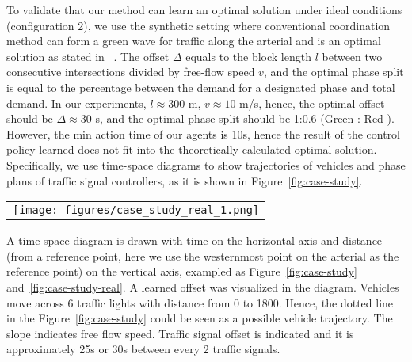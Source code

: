 To validate that our method can learn an optimal solution under ideal conditions (configuration 2), we use the synthetic setting where conventional coordination method \Greenwave can form a green wave for traffic along the arterial and is an optimal solution as stated in ~\cite{Roess2011t}. The \Greenwave offset $\Delta$ equals to the block length $l$ between two consecutive intersections divided by free-flow speed $v$, and the optimal phase split is equal to the percentage between the demand for a designated phase and total demand. In our experiments, $l\approx 300$ m, $v\approx 10$ m/s, hence, the optimal offset should be $\Delta\approx 30$ s, and the optimal phase split should be 1:0.6 (Green-\WE : Red-\WE). However, the min action time of our agents is 10s, hence the result of the control policy learned does not fit into the theoretically calculated optimal solution. Specifically, we use time-space diagrams to show trajectories of vehicles and phase plans of traffic signal controllers, as it is shown in Figure~\ref{fig:case-study}. 

\begin{figure*}[t!]
  \centering
  \begin{tabular}{c}
   \texttt{[image: figures/case\_study\_real\_1.png]} \\
   \end{tabular}
     \caption{Space-time diagram with signal timing plan to illustrate the learned coordination strategy from real-world data on the arterial of Qingdao Road in the morning (around 8:30 a.m.) of August 6th.}
    \label{fig:case-study-real}
\end{figure*}

A time-space diagram is drawn with time on the horizontal axis and distance (from a reference point, here we use the westernmost point on the arterial as the reference point) on the vertical axis, exampled as Figure~\ref{fig:case-study} and~\ref{fig:case-study-real}. A learned offset was visualized in the diagram. Vehicles move across 6 traffic lights with distance from 0 to 1800. Hence, the dotted line in the Figure~\ref{fig:case-study} could be seen as a possible vehicle trajectory. The slope indicates free flow speed. Traffic signal offset is indicated and it is approximately 25s or 30s between every 2 traffic signals.



